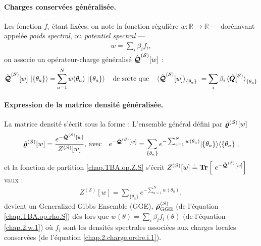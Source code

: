\paragraph{Charges conservées généralisée.\label{sec:charges-gen}}
Les fonction $f_i$ étant fixées, on note la fonction régulière
\(
  w:\mathbb R\!\to\!\mathbb R
\)
–– dorénavant appelée \emph{poids spectral}, ou \emph{potentiel spectral} ––
\begin{eqnarray}
	w = \sum_i \beta_i f_i \label{chap.2.w.1},	
\end{eqnarray}
on associe un opérateur-charge généralisé $\hat{\bm{\mathcal{Q}}}^{(\mathcal{S})}[w]$ :
\begin{eqnarray}\label{chap.2.charge.gen.1}
	\operator{\mathcal{Q}}^{(\mathcal{S})}[w]\,\ket{\{\theta_a\} } =  \sum_{a=1}^{N}w(\theta_a)\,\ket{\{\theta_a\} } \quad \mbox{de sorte que} \quad \braket{\operator{\mathcal{Q}}^{(\mathcal{S})}[w]}_{\{\theta_a\}} = \sum_{i} \beta_i  \braket{\operator{Q}^{(\mathcal{S})}_i}_{\{\theta_a\}}
\end{eqnarray}

\paragraph{Expression de la matrice densité généralisée.}
La matrice densité  s’écrit sous la forme :
L’ensemble général défini par $\hat{\bm{\varrho}}^{(\mathcal{S})}[w]$ 
\begin{eqnarray}\label{chap.2.densite.1}
	\hat{\bm{\varrho}}^{(\mathcal{S})}[w]  =  \frac{e^{-\hat{\bm{\mathcal{Q}}}^{(\mathcal{S})}[w]}}{Z^{(\mathcal{S})}[w]}, \, \mbox{avec} \quad e^{-\hat{\bm{\mathcal{Q}}}^{(\mathcal{S})}[w]}  = 	\sum_{\{\theta_a \}} e^{- \sum_{a = 1}^N w(\theta_a) } \vert \{ \theta_a\} \rangle \langle  \{ \theta_a\}  \vert, 
\end{eqnarray}	
et la fonction de partition \eqref{chap.TBA.op.Z.S} s'écrit $Z^{(\mathcal{S})}[w]\doteq \bm{\mathrm{Tr}}\left [ e^{-\operator{\mathcal{Q}}^{(\mathcal{S})}[w]}\right ] $ vaux :
\begin{eqnarray}
	Z^{(\mathcal{S})}[w]   =  \sum_{\{\theta_a \}} e^{-\sum_{a = 1}^N w(\theta_a)},\label{chap.TBA.op.Z.S.1}	
\end{eqnarray}
devient un Generalized Gibbs Ensemble (GGE), $\hat{\bm{\rho}}^{(\mathcal{S})}_{\mathrm{GGE}}$ (de l'équation \eqref{chap.TBA.op.rho.S})	 dès lors que $w(\theta) = \sum_i \beta_i f_i(\theta)$ (de l'équation \eqref{chap.2.w.1}) où $f_i$ sont les densités spectrales associées aux charges locales conservées (de l'équation \eqref{chap.2.charge.ordre.i.1}).


